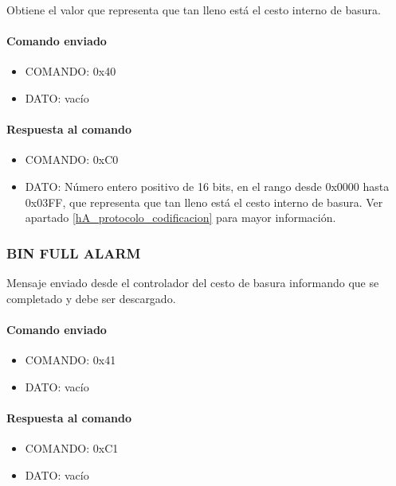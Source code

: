 Obtiene el valor que representa que tan lleno est\'a el cesto interno de basura.

\paragraph*{Comando enviado}

\begin{itemize}
	\item{COMANDO:} 0x40
	\item{DATO:} vac\'io
\end{itemize}

\paragraph*{Respuesta al comando}

\begin{itemize}
	\item{COMANDO:} 0xC0
	\item{DATO:} N\'umero entero positivo de 16 bits, en el rango desde 0x0000 hasta 0x03FF,
		que representa que tan lleno est\'a el cesto interno de basura.
		Ver apartado \ref{hA_protocolo_codificacion} para mayor informaci\'on.
\end{itemize}

\subsubsection{BIN FULL ALARM}
\label{hA_protocolo_bin_full_alarm}

Mensaje enviado desde el controlador del cesto de basura informando que se completado y debe ser descargado.

\paragraph*{Comando enviado}

\begin{itemize}
	\item{COMANDO:} 0x41
	\item{DATO:} vac\'io
\end{itemize}

\paragraph*{Respuesta al comando}

\begin{itemize}
	\item{COMANDO:} 0xC1
	\item{DATO:} vac\'io
\end{itemize}

